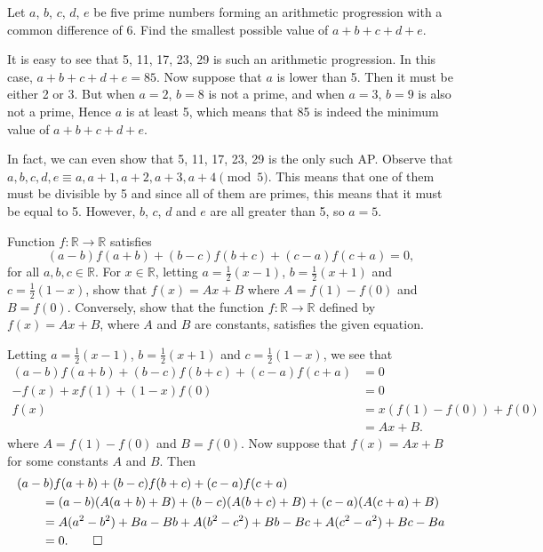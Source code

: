 \begin{question}
    Let $a$, $b$, $c$, $d$, $e$ be five prime numbers forming an arithmetic
    progression with a common difference of 6. Find the smallest possible value
    of $a + b + c + d + e$. 
\end{question}
\begin{solution}
    It is easy to see that 5, 11, 17, 23, 29 is such an arithmetic progression.
    In this case, $a + b + c + d + e = 85$. Now suppose that $a$ is lower than
    5. Then it must be either 2 or 3. But when $a = 2$, $b = 8$ is not a prime,
    and when $a = 3$, $b = 9$ is also not a prime, Hence $a$ is at least 5,
    which means that 85 is indeed the minimum value of $a + b + c + d + e$.
\end{solution}
\begin{remark}
    In fact, we can even show that 5, 11, 17, 23, 29 is the only such AP.
    Observe that $a, b, c, d, e \equiv a, a + 1, a + 2, a + 3, a + 4 \pmod{5}$.
    This means that one of them must be divisible by 5 and since all of them
    are primes, this means that it must be equal to 5. However, $b$, $c$, $d$
    and $e$ are all greater than 5, so $a = 5$. 
\end{remark}

\begin{question}
    Function $f:\mathbb{R} \rightarrow \mathbb{R}$ satisfies 
    \[(a - b)f(a + b) + (b - c)f(b + c) + (c - a)f(c + a) = 0,\] 
    for all $a, b, c \in \mathbb{R}$. For $x \in \mathbb{R}$, letting $a =
    \frac{1}{2}(x - 1)$, $b = \frac{1}{2}(x + 1)$ and $c = \frac{1}{2}(1 - x)$,
    show that $f(x) = Ax + B$ where $A = f(1) - f(0)$ and $B = f(0)$.
    Conversely, show that the function $f:\mathbb{R} \rightarrow \mathbb{R}$
    defined by $f(x) = Ax + B$, where $A$ and $B$ are constants, satisfies the
    given equation. 
\end{question}
\begin{solution}
    Letting $a = \frac{1}{2}(x - 1)$, $b = \frac{1}{2}(x + 1)$ and $c =
    \frac{1}{2}(1 - x)$, we see that
    \begin{align*}
        (a - b)f(a + b) + (b - c)f(b + c) + (c - a)f(c + a) &= 0\\
        -f(x) + xf(1) + (1 - x)f(0) &= 0\\
        f(x) &= x(f(1) - f(0)) + f(0)\\
        &= Ax + B.
    \end{align*}
    where $A = f(1) - f(0)$ and $B = f(0)$. Now suppose that $f(x) =  Ax + B$
    for some constants $A$ and $B$. Then
    \begin{align*}
        \MoveEqLeft
    (a - b)f(a + b) + (b - c)f(b + c) + (c - a)f(c + a)\\
        &= (a - b)(A(a + b) + B) + (b - c)(A(b + c) + B) + (c - a)(A(c + a) + B)\\
        &= A(a^2 - b^2) + Ba - Bb + A(b^2 - c^2) + Bb - Bc + A(c^2 - a^2) + Bc - Ba\\
        &= 0. \qedhere
    \end{align*}
\end{solution}

